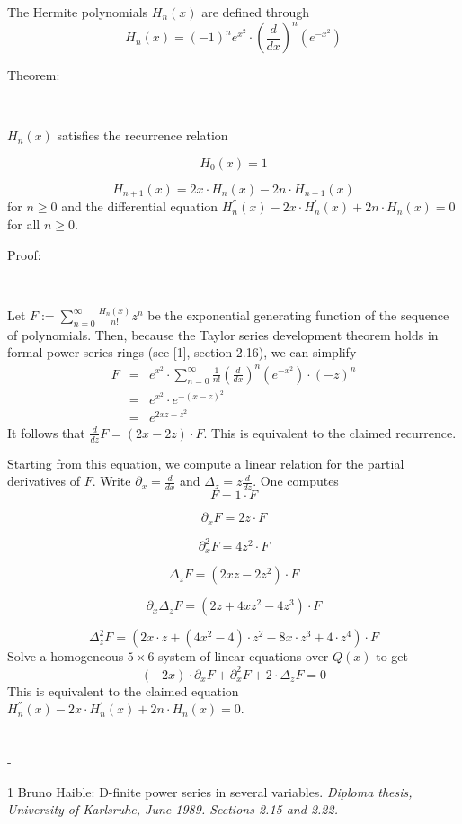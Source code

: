 \documentclass[12pt,a4paper,oneside,onecolumn]{article}
\makeatletter
\newenvironment{lyxsectionbibliography}
{
\section*{\refname}
\@mkboth{\uppercase{\refname}}{\uppercase{\refname}}
\begin{list}{}{
\itemindent-\leftmargin
\labelsep 0pt
\renewcommand{\makelabel}{}
}
}
{\end{list}}
\makeatother
\begin{document}
The Hermite polynomials  \( H_{n}(x) \) are defined through 
\[
H_{n}(x)=(-1)^{n}e^{x^{2}}\cdot \left( \frac{d}{dx}\right) ^{n}\left( e^{-x^{2}}\right) \]


\begin{description}

\item [Theorem:]~

\end{description}

 \( H_{n}(x) \) satisfies the recurrence relation


\[
H_{0}(x)=1\]



\[
H_{n+1}(x)=2x\cdot H_{n}(x)-2n\cdot H_{n-1}(x)\]
 for  \( n\geq 0 \) and the differential equation  \( H_{n}^{''}(x)-2x\cdot H_{n}^{'}(x)+2n\cdot H_{n}(x)=0 \) for all  \( n\geq 0 \).

\begin{description}

\item [Proof:]~

\end{description}

Let  \( F:=\sum ^{\infty }_{n=0}\frac{H_{n}(x)}{n!}z^{n} \) be the exponential generating function of the sequence of polynomials.
Then, because the Taylor series development theorem holds in formal
power series rings (see [1], section 2.16), we can simplify
\begin{eqnarray*}
F & = & e^{x^{2}}\cdot \sum ^{\infty }_{n=0}\frac{1}{n!}\left( \frac{d}{dx}\right) ^{n}\left( e^{-x^{2}}\right) \cdot (-z)^{n}\\
 & = & e^{x^{2}}\cdot e^{-(x-z)^{2}}\\
 & = & e^{2xz-z^{2}}
\end{eqnarray*}
It follows
that  \( \frac{d}{dz}F=(2x-2z)\cdot F \). This is equivalent to the claimed recurrence.

Starting from this equation, we compute a linear relation for the
partial derivatives of  \( F \). Write  \( \partial _{x}=\frac{d}{dx} \) and  \( \Delta _{z}=z\frac{d}{dz} \). One computes
\[
F=1\cdot F\]

\[
\partial _{x}F=2z\cdot F\]

\[
\partial _{x}^{2}F=4z^{2}\cdot F\]

\[
\Delta _{z}F=(2xz-2z^{2})\cdot F\]

\[
\partial _{x}\Delta _{z}F=(2z+4xz^{2}-4z^{3})\cdot F\]

\[
\Delta _{z}^{2}F=\left( 2x\cdot z+(4x^{2}-4)\cdot z^{2}-8x\cdot z^{3}+4\cdot z^{4}\right) \cdot F\]
 Solve
a homogeneous  \( 5\times 6 \) system of linear equations over  \( Q(x) \) to get 
\[
(-2x)\cdot \partial _{x}F+\partial _{x}^{2}F+2\cdot \Delta _{z}F=0\]
 This is
equivalent to the claimed equation  \( H_{n}^{''}(x)-2x\cdot H_{n}^{'}(x)+2n\cdot H_{n}(x)=0 \).

\begin{lyxsectionbibliography}

\item [1] Bruno Haible: D-finite power series in several variables. \em Diploma
thesis, University of Karlsruhe, June 1989\em . Sections 2.15 and
2.22.

\end{lyxsectionbibliography}
\end{document}
